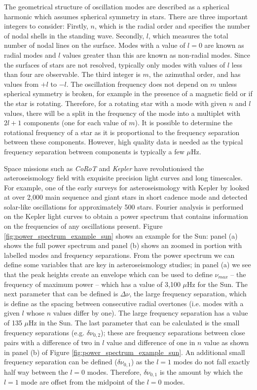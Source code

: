 The geometrical structure of oscillation modes are described as a spherical harmonic which assumes spherical symmetry in stars. There are three important integers to consider: Firstly, $n$, which is the radial order and specifies the number of nodal shells in the standing wave. Secondly, $l$, which measures the total number of nodal lines on the surface. Modes with a value of $l=0$ are known as radial modes and $l$ values greater than this are known as non-radial modes. Since the surfaces of stars are not resolved, typically only modes with values of $l$ less than four are observable. The third integer is $m$, the azimuthal order, and has values from $+l$ to $-l$. The oscillation frequency does not depend on $m$ unless spherical symmetry is broken, for example in the presence of a magnetic field or if the star is rotating. Therefore, for a rotating star with a mode with given $n$ and $l$ values, there will be a split in the frequency of the mode into a multiplet with $2l + 1$ components (one for each value of $m$). It is possible to determine the rotational frequency of a star as it is proportional to the frequency separation between these components. However, high quality data is needed as the typical frequency separation between components is typically a few $\mu$Hz.

Space missions such as \textit{CoRoT} and \textit{Kepler} have revolutionised the asteroseismology field with exquisite precision light curves and long timescales. For example, one of the early surveys for asteroseismology with Kepler by \citet{Chaplin_etal_2011} looked at over 2,000 main sequence and giant stars in short cadence mode and detected solar-like oscillations for approximately 500 stars. Fourier analysis is performed on the Kepler light curves to obtain a power spectrum that contains information on the frequencies of any oscillations present. Figure \ref{fig:power_spectrum_example_sun} shows an example for the Sun: panel (a) shows the full power spectrum and panel (b) shows an zoomed in portion with labelled modes and frequency separations. From the power spectrum we can define some variables that are key in asteroseismology studies; in panel (a) we see that the peak heights create an envelope which can be used to define $\nu_{max}$ -- the frequency of maximum power -- which has a value of 3,100 $\mu$Hz for the Sun. The next parameter that can be defined is $\Delta \nu$, the large frequency separation, which is define as the spacing between consecutive radial overtones (i.e. modes with a given $l$ whose $n$ values differ by one). The large frequency separation has a value of 135 $\mu$Hz in the Sun. The last parameter that can be calculated is the small frequency separations (e.g. $\delta \nu_{0,2}$); these are frequency separations between close pairs with a difference of two in $l$ value and difference of one in $n$ value as shown in panel (b) of Figure \ref{fig:power_spectrum_example_sun}. An additional small frequency separation can be defined ($\delta \nu_{0,1}$) as the $l=1$ modes do not fall exactly half way between the $l=0$ modes. Therefore, $\delta \nu_{0,1}$ is the amount by which the $l=1$ mode are offset from the midpoint of the $l=0$ modes.

